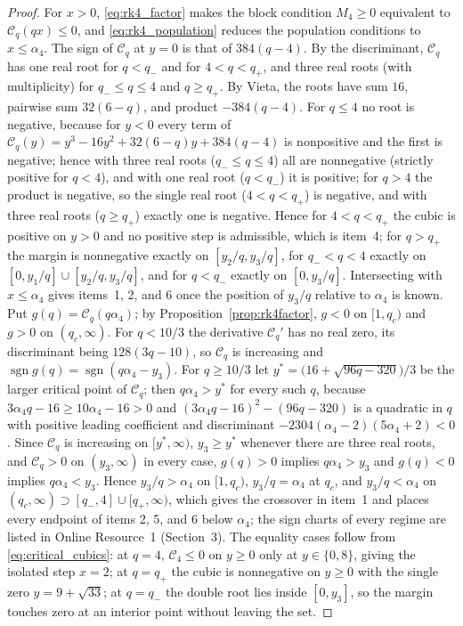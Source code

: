\documentclass[pdflatex,sn-mathphys-num]{sn-jnl}
\theoremstyle{thmstyleone}
\theoremstyle{thmstylethree}
\theoremstyle{thmstyletwo}
\begin{document}
\begin{proof}
For $x>0$, \eqref{eq:rk4_factor} makes the block condition $M_4\ge0$ equivalent to $\mathcal C_q(qx)\le0$, and \eqref{eq:rk4_population} reduces the population conditions to $x\le\alpha_4$. The sign of $\mathcal C_q$ at $y=0$ is that of $384(q-4)$. By the discriminant, $\mathcal C_q$ has one real root for $q<q_-$ and for $4<q<q_+$, and three real roots (with multiplicity) for $q_-\le q\le4$ and $q\ge q_+$. By Vieta, the roots have sum $16$, pairwise sum $32(6-q)$, and product $-384(q-4)$. For $q\le4$ no root is negative, because for $y<0$ every term of $\mathcal C_q(y)=y^3-16y^2+32(6-q)y+384(q-4)$ is nonpositive and the first is negative; hence with three real roots ($q_-\le q\le4$) all are nonnegative (strictly positive for $q<4$), and with one real root ($q<q_-$) it is positive; for $q>4$ the product is negative, so the single real root ($4<q<q_+$) is negative, and with three real roots ($q\ge q_+$) exactly one is negative. Hence for $4<q<q_+$ the cubic is positive on $y>0$ and no positive step is admissible, which is item~4; for $q>q_+$ the margin is nonnegative exactly on $[y_2/q,y_3/q]$, for $q_-<q<4$ exactly on $[0,y_1/q]\cup[y_2/q,y_3/q]$, and for $q<q_-$ exactly on $[0,y_3/q]$. Intersecting with $x\le\alpha_4$ gives items~1, 2, and 6 once the position of $y_3/q$ relative to $\alpha_4$ is known. Put $g(q)=\mathcal C_q(q\alpha_4)$; by Proposition~\ref{prop:rk4factor}, $g<0$ on $[1,q_c)$ and $g>0$ on $(q_c,\infty)$. For $q<10/3$ the derivative $\mathcal C_q'$ has no real zero, its discriminant being $128(3q-10)$, so $\mathcal C_q$ is increasing and $\operatorname{sgn}g(q)=\operatorname{sgn}(q\alpha_4-y_3)$. For $q\ge10/3$ let $y^*=\big(16+\sqrt{96q-320}\big)/3$ be the larger critical point of $\mathcal C_q$; then $q\alpha_4>y^*$ for every such $q$, because $3\alpha_4q-16\ge10\alpha_4-16>0$ and $(3\alpha_4q-16)^2-(96q-320)$ is a quadratic in $q$ with positive leading coefficient and discriminant $-2304(\alpha_4-2)(5\alpha_4+2)<0$. Since $\mathcal C_q$ is increasing on $[y^*,\infty)$, $y_3\ge y^*$ whenever there are three real roots, and $\mathcal C_q>0$ on $(y_3,\infty)$ in every case, $g(q)>0$ implies $q\alpha_4>y_3$ and $g(q)<0$ implies $q\alpha_4<y_3$. Hence $y_3/q>\alpha_4$ on $[1,q_c)$, $y_3/q=\alpha_4$ at $q_c$, and $y_3/q<\alpha_4$ on $(q_c,\infty)\supset[q_-,4]\cup[q_+,\infty)$, which gives the crossover in item~1 and places every endpoint of items 2, 5, and 6 below $\alpha_4$; the sign charts of every regime are listed in Online Resource~1 (Section~3). The equality cases follow from \eqref{eq:critical_cubics}: at $q=4$, $\mathcal C_4\le0$ on $y\ge0$ only at $y\in\{0,8\}$, giving the isolated step $x=2$; at $q=q_+$ the cubic is nonnegative on $y\ge0$ with the single zero $y=9+\sqrt{33}$; at $q=q_-$ the double root lies inside $[0,y_3]$, so the margin touches zero at an interior point without leaving the set.
\end{proof}
\end{document}
